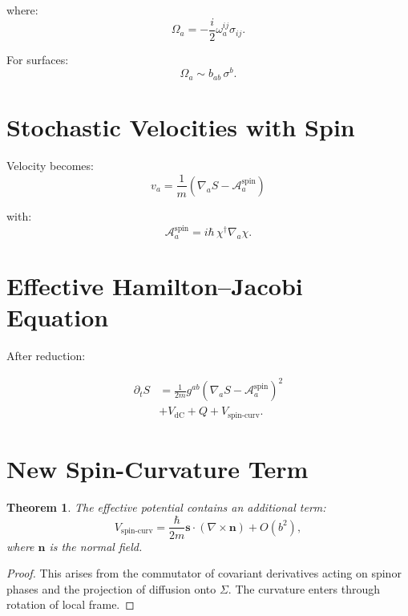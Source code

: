 \documentclass[11pt]{article}
\newtheorem{theorem}{Theorem}
\begin{document}
where:
\begin{equation}
\Omega_a = -\frac{i}{2}\omega_a^{ij} \sigma_{ij}.
\end{equation}

For surfaces:
\begin{equation}
\Omega_a \sim b_{ab}\, \sigma^b.
\end{equation}

\section{Stochastic Velocities with Spin}

Velocity becomes:
\begin{equation}
v_a = \frac{1}{m}\left( \nabla_a S - \mathcal{A}_a^{\text{spin}} \right)
\end{equation}

with:
\begin{equation}
\mathcal{A}_a^{\text{spin}} = i\hbar\, \chi^\dagger \nabla_a \chi.
\end{equation}

\section{Effective Hamilton--Jacobi Equation}

After reduction:

\begin{align}
\partial_t S &= \frac{1}{2m} g^{ab}
(\nabla_a S - \mathcal{A}_a^{\text{spin}})^2 \\
&+ V_{\text{dC}} + Q + V_{\text{spin-curv}}.
\end{align}

\section{New Spin-Curvature Term}

\begin{theorem}
The effective potential contains an additional term:
\begin{equation}
V_{\text{spin-curv}} = \frac{\hbar}{2m} \mathbf{s} \cdot (\nabla \times \mathbf{n}) + O(b^2),
\end{equation}
where $\mathbf{n}$ is the normal field.
\end{theorem}

\begin{proof}
This arises from the commutator of covariant derivatives acting on spinor phases and the projection of diffusion onto $\Sigma$. The curvature enters through rotation of local frame.
\end{proof}
\end{document}
